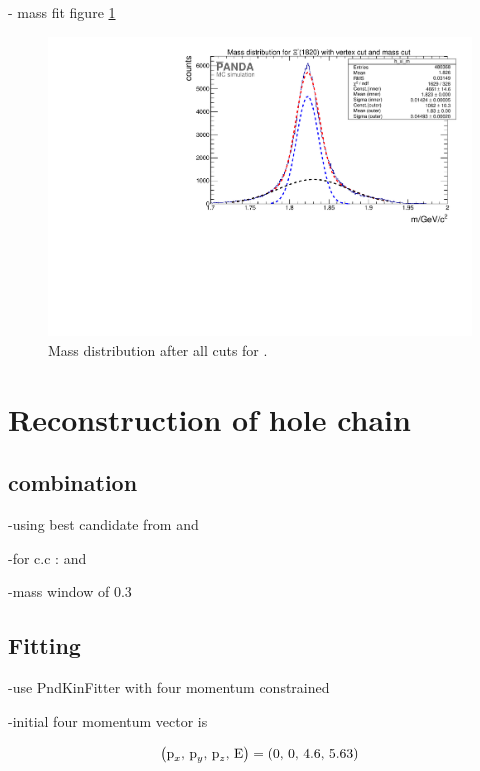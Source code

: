 	- mass fit figure \ref{fig:xi1820_massfit}
	
	\begin{figure}
		\centering
		\includegraphics[width=1.\textwidth]{./plots/Xi1820/XiMinus1820_m_masscut.pdf}
		\caption{Mass distribution after all cuts for \excitedcascade.}
		\label{fig:xi1820_massfit}
	
	\end{figure}
	
	
\section{Reconstruction of hole chain}

	\subsection*{combination}
	
	-using best candidate from \excitedcascade and \anticascade
	
	-for c.c : \excitedanticascade and \cascade
	
	-mass window of $0.3$\massunit
	
	
	\subsection*{Fitting}
	
	-use PndKinFitter with four momentum constrained
	
	-initial four momentum vector is 
	\begin{center}
		\begin{equation}\nonumber
			\left(\textnormal{p}_x,\, \textnormal{p}_y,\, \textnormal{p}_z,\, \textnormal{E} \right) = \left(0,\, 0,\, 4.6,\, 5.63 \right)
		\end{equation}
	\end{center}
	

